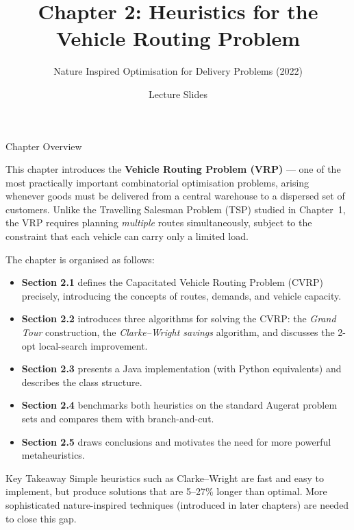 \documentclass[aspectratio=169,10pt]{beamer}
\title[VRP Heuristics]{Chapter 2: Heuristics for the Vehicle Routing Problem}
\subtitle{Nature Inspired Optimisation for Delivery Problems (2022)}
\author{Lecture Slides}
\date{}
\begin{document}

\begin{frame}
  \titlepage
\end{frame}

\begin{frame}[allowframebreaks]{Chapter Overview}

  This chapter introduces the \textbf{Vehicle Routing Problem (VRP)} --- one of
  the most practically important combinatorial optimisation problems, arising
  whenever goods must be delivered from a central warehouse to a dispersed set
  of customers.  Unlike the Travelling Salesman Problem (TSP) studied in
  Chapter~1, the VRP requires planning \emph{multiple} routes simultaneously,
  subject to the constraint that each vehicle can carry only a limited load.

  \bigskip
  The chapter is organised as follows:

  \begin{itemize}
    \item \textbf{Section 2.1} defines the Capacitated Vehicle Routing Problem
      (CVRP) precisely, introducing the concepts of routes, demands, and vehicle
      capacity.
    \item \textbf{Section 2.2} introduces three algorithms for solving the CVRP:
      the \emph{Grand Tour} construction, the \emph{Clarke--Wright savings}
      algorithm, and discusses the 2-opt local-search improvement.
    \item \textbf{Section 2.3} presents a Java implementation (with Python
      equivalents) and describes the class structure.
    \item \textbf{Section 2.4} benchmarks both heuristics on the standard
      Augerat problem sets and compares them with branch-and-cut.
    \item \textbf{Section 2.5} draws conclusions and motivates the need for more
      powerful metaheuristics.
  \end{itemize}

  \begin{alertblock}{Key Takeaway}
    Simple heuristics such as Clarke--Wright are fast and easy to implement,
    but produce solutions that are 5--27\% longer than optimal.  More
    sophisticated nature-inspired techniques (introduced in later chapters)
    are needed to close this gap.
  \end{alertblock}

\end{frame}
\end{document}
